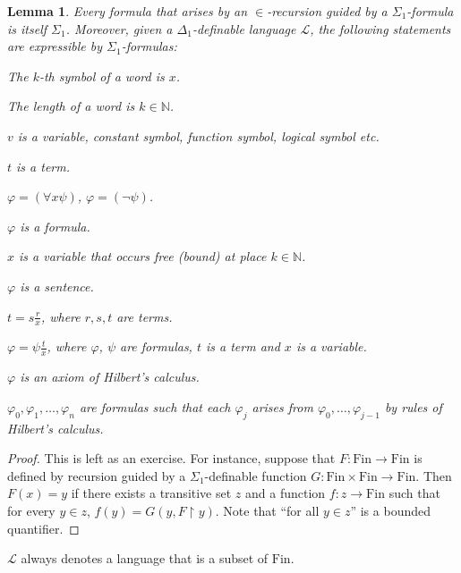 \documentclass[a4paper, 11pt]{amsart}
\newtheorem{lemma}[lemma]{Lemma}
\theoremstyle{remark}
\newcommand{\NN}{\mathbb{N}}
\newcommand{\Fin}{\mathrm{Fin}}
\newcommand{\cL}{\mathcal L}
\newenvironment{enumerate-(1)}{\begin{enumerate}[label={\upshape (\arabic*)}, leftmargin=2pc]}{\end{enumerate}}
\begin{document}
\begin{lemma} 
\label{some Sigma1-definable notions} 
Every formula that arises by an $\in$-recursion guided by a $\Sigma_1$-formula is itself $\Sigma_1$. 
Moreover, given a $\Delta_1$-definable language $\cL$, the following statements are expressible by $\Sigma_1$-formulas: 
\begin{enumerate-(1)} 
\item 
The $k$-th symbol of a word is $x$. 
\item 
The length of a word is $k\in \NN$. 
\item 
$v$ is a variable, constant symbol, function symbol, logical symbol etc. 
\item 
$t$ is a term. 
\item 
$\varphi= (\forall x \psi)$, $\varphi = (\neg \psi)$. 
\item 
$\varphi$ is a formula. 
\item 
$x$ is a variable that occurs free (bound) at place $k\in \NN$. 
\item 
$\varphi$ is a sentence. 
\item 
$t=s\frac{r}{x}$, where $r,s,t$ are terms. 
\item 
$\varphi= \psi\frac{t}{x}$, where $\varphi$, $\psi$ are formulas, $t$ is a term and $x$ is a variable. 
\item 
$\varphi$ is an axiom of Hilbert's calculus. 
\item 
$\varphi_0,\varphi_1,\dots,\varphi_n$ are formulas such that each $\varphi_j$ arises from $\varphi_0,\dots,\varphi_{j-1}$ by rules of Hilbert's calculus. 
\end{enumerate-(1)} 
\end{lemma} 
\begin{proof} 
This is left as an exercise. 
For instance, suppose that $F\colon \Fin \rightarrow \Fin$ is defined by recursion guided by a $\Sigma_1$-definable function $G\colon \Fin\times \Fin \rightarrow \Fin$. 
Then $F(x)=y$ if there exists a transitive set $z$ and a function $f\colon z\rightarrow \Fin$ such that for every $y\in z$, $f(y)=G(y,F{\upharpoonright}y)$. 
Note that ``for all $y\in z$'' is a bounded quantifier. 
\end{proof}

$\cL$ always denotes a language that is a subset of $\Fin$. 
\end{document}

